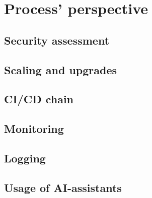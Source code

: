 \section{Process' perspective}
\subsection{Security assessment}


\subsection{Scaling and upgrades}


\subsection{CI/CD chain}\label{cicd}


\subsection{Monitoring}


\newpage
\subsection{Logging}


\subsection{Usage of AI-assistants}
